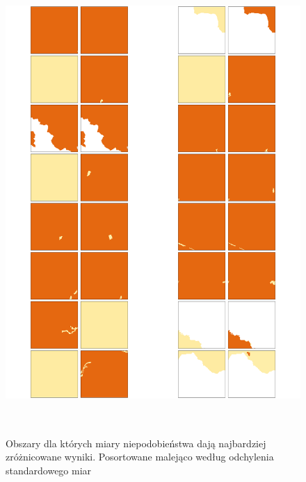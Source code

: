 \documentclass{amuthesis}
\begin{document}
\begin{figure}[t]

{\centering \includegraphics[width=5.20833in,height=6.9375in]{figures/obszary_odst.png}

}

\caption{\label{fig-obszary_odst}Obszary dla których miary
niepodobieństwa dają najbardziej zróżnicowane wyniki. Posortowane
malejąco według odchylenia standardowego miar}

\end{figure}
\end{document}
